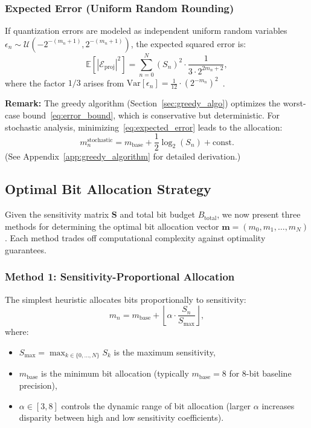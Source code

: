 \subsubsection{Expected Error (Uniform Random Rounding)}

If quantization errors are modeled as independent uniform random variables $\epsilon_n \sim \mathcal{U}(-2^{-(m_n+1)}, 2^{-(m_n+1)})$, the expected squared error is:
\begin{equation}
\mathbb{E}[|\mathcal{E}_{\text{proj}}|^2] = \sum_{n=0}^{N} (S_n)^2 \cdot \frac{1}{3 \cdot 2^{2m_n+2}},
\label{eq:expected_error}
\end{equation}
where the factor $1/3$ arises from $\mathrm{Var}[\epsilon_n] = \frac{1}{12} \cdot (2^{-m_n})^2$~\cite{Widrow1996}.

\textbf{Remark:} The greedy algorithm (Section~\ref{sec:greedy_algo}) optimizes the worst-case bound~\eqref{eq:error_bound}, which is conservative but deterministic. For stochastic analysis, minimizing~\eqref{eq:expected_error} leads to the allocation:
\begin{equation}
m_n^{\text{stochastic}} = m_{\text{base}} + \frac{1}{2} \log_2(S_n) + \text{const.}
\label{eq:stochastic_alloc}
\end{equation}
(See Appendix~\ref{app:greedy_algorithm} for detailed derivation.)

\subsection{Optimal Bit Allocation Strategy}
\label{sec:bit_allocation}

Given the sensitivity matrix $\mathbf{S}$ and total bit budget $B_{\text{total}}$, we now present three methods for determining the optimal bit allocation vector $\mathbf{m} = (m_0, m_1, \ldots, m_N)$. Each method trades off computational complexity against optimality guarantees.

\subsubsection{Method 1: Sensitivity-Proportional Allocation}
\label{sec:prop_alloc}

The simplest heuristic allocates bits proportionally to sensitivity:
\begin{equation}
m_n = m_{\text{base}} + \left\lfloor \alpha \cdot \frac{S_n}{S_{\max}} \right\rfloor,
\label{eq:prop_alloc}
\end{equation}
where:
\begin{itemize}
\item $S_{\max} = \max_{k \in \{0, \ldots, N\}} S_k$ is the maximum sensitivity,
\item $m_{\text{base}}$ is the minimum bit allocation (typically $m_{\text{base}} = 8$ for 8-bit baseline precision),
\item $\alpha \in [3, 8]$ controls the dynamic range of bit allocation (larger $\alpha$ increases disparity between high and low sensitivity coefficients).
\end{itemize}

